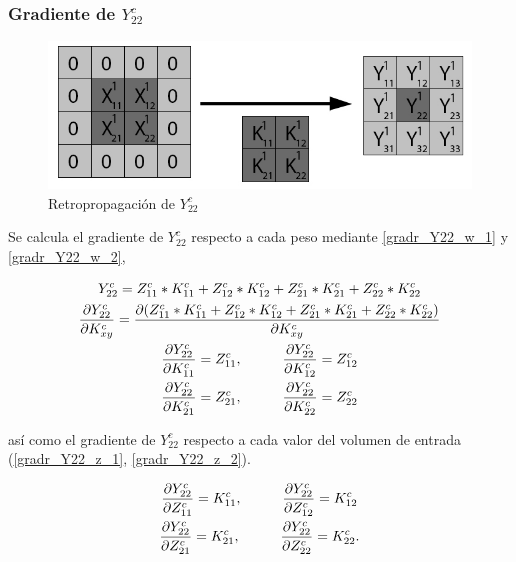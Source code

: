 \subsubsection{Gradiente de $Y^c_{22}$}

\begin{figure}[H]
	\centering
	\includegraphics[width=0.8\linewidth]{imagenes/conv_back_padding_5.jpg} 
	\caption{Retropropagación de $Y^c_{22}$}
\end{figure}

Se calcula el gradiente de $Y^c_{22}$ respecto a cada peso mediante \ref{gradr_Y22_w_1} y \ref{gradr_Y22_w_2},


\begin{gather}
	Y^c_{22} = Z^c_{11} * K^c_{11} + Z^c_{12} * K^c_{12} + Z^c_{21} * K^c_{21} + Z^c_{22} * K^c_{22} \\
	\frac{\partial Y^c_{22}}{\partial K^c_{xy}} = \frac{\partial (Z^c_{11} * K^c_{11} + Z^c_{12} * K^c_{12} + Z^c_{21} * K^c_{21} + Z^c_{22} * K^c_{22})}{\partial K^c_{xy}} \\
	\frac{\partial Y^c_{22}}{\partial K^c_{11}} = Z^c_{11}, \hspace{10mm} \frac{\partial Y^c_{22}}{\partial K^c_{12}} = Z^c_{12} \label{gradr_Y22_w_1} \\
	\frac{\partial Y^c_{22}}{\partial K^c_{21}} = Z^c_{21}, \hspace{10mm} \frac{\partial Y^c_{22}}{\partial K^c_{22}} = Z^c_{22} \label{gradr_Y22_w_2}
\end{gather}

así como el gradiente de $Y^c_{22}$ respecto a cada valor del volumen de entrada (\ref{gradr_Y22_z_1}, \ref{gradr_Y22_z_2}).

\begin{gather}
	\frac{\partial Y^c_{22}}{\partial Z^c_{11}} = K^c_{11}, \hspace{10mm} \frac{\partial Y^c_{22}}{\partial Z^c_{12}} = K^c_{12} \label{gradr_Y22_z_1} \\
	\frac{\partial Y^c_{22}}{\partial Z^c_{21}} = K^c_{21}, \hspace{10mm} \frac{\partial Y^c_{22}}{\partial Z^c_{22}} = K^c_{22} \label{gradr_Y22_z_2}.
\end{gather}

